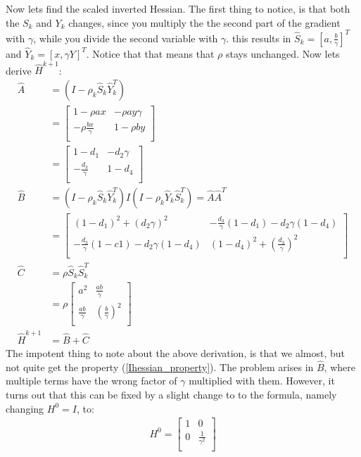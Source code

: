 \documentclass[11pt,a4paper]{article}
\begin{document}
Now lets find the scaled inverted Hessian. The first thing to notice, is that both the $S_k$ and $Y_k$ changes, since you multiply the the second part of the gradient with $\gamma$, while you divide the second variable with $\gamma$. this results in $\hat{S}_k=[a,\frac{b}{\gamma}]^T$ and $\hat{Y}_k=[x,\gamma Y]^T$. Notice that that means that $\rho$ stays unchanged. Now lets derive $\hat{H}^{k+1}$:
\begin{align*}
\hat{A} &= (I-\rho_k\hat{S}_k\hat{Y}_k^T) \\
&=\left[ \begin{array}{cc}
   	1-\rho ax & -\rho ay\gamma\\
    	-\rho \frac{bx}{\gamma}& 1-\rho by\\
   \end{array}  \right] \\
&=\left[ \begin{array}{cc}
   	1-d_1 & -d_2\gamma\\
    	-\frac{d_3}{\gamma}& 1-d_4\\
   \end{array}  \right] \\
\hat{B} &= (I-\rho_k\hat{S}_k\hat{Y}_k^T)I(I-\rho_k\hat{Y}_k\hat{S}_k^T) = \hat{A}\hat{A}^T \\
&=\left[ \begin{array}{cc}
   	(1-d_1)^2 + (d_2\gamma)^2& -\frac{d_3}{\gamma}(1-d_1) -d_2\gamma(1-d_4)\\
    	-\frac{d_3}{\gamma}(1-c1)-d_2\gamma(1-d_4)& (1-d_4)^2 +(\frac{d_3}{\gamma})^2\\
   \end{array}  \right] \\
\hat{C}&= \rho \hat{S}_k\hat{S}_k^T \\
&=\rho\left[ \begin{array}{cc}
   	a^2  & \frac{ab}{\gamma}\\
    	\frac{ab}{\gamma}& (\frac{b}{\gamma})^2\\
   \end{array}  \right] \\
\hat{H}^{k+1}&=\hat{B}+\hat{C}
\end{align*}
The impotent thing to note about the above derivation, is that we almost, but not quite get the property (\ref{Ihessian_property}). The problem arises in $\hat{B}$, where multiple terms have the wrong factor of $\gamma$ multiplied with them. However, it turns out that this can be fixed by a slight change to to the formula, namely changing $H^0=I$, to:
\begin{align*}
	H^0 = \left[ \begin{array}{cc}
   	1 & 0\\
    	0& \frac{1}{\gamma^2}\\
   \end{array}  \right]
\end{align*}
\end{document}

